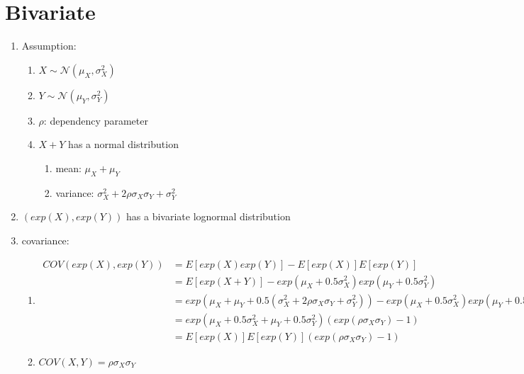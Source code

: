 \section{Bivariate \cite{ism-1}} \label{Lognormal Distribution: Bivariate}

\begin{enumerate}
    \item Assumption:
    \begin{enumerate}
        \item $X \sim \mathcal{N}(\mu_X, \sigma_X^2)$

        \item $Y \sim \mathcal{N}(\mu_Y, \sigma_Y^2)$

        \item $\rho$: dependency parameter

        \item $X + Y$ has a normal distribution
        \begin{enumerate}
            \item mean: $\mu_X + \mu_Y$

            \item variance: $\sigma_X^2 + 2\rho\sigma_X\sigma_Y + \sigma_Y^2$
        \end{enumerate}

    \end{enumerate}

    \item $(exp(X), exp(Y))$ has a bivariate lognormal distribution

    \item covariance:
    \begin{enumerate}
        \item 
        $\begin{aligned}
            COV(exp(X), exp(Y )) 
            &= E[exp(X) exp(Y )] - E[exp(X)]E[exp(Y )] \\
            &= E[exp(X + Y )] - exp(\mu_X + 0.5\sigma^2_X ) exp(\mu_Y + 0.5\sigma^2_Y ) \\
            &= exp(\mu_X + \mu_Y + 0.5(\sigma^2_X + 2\rho\sigma_X \sigma_Y + \sigma^2_Y ))
                 -exp(\mu_X + 0.5\sigma^2_X ) exp(\mu_Y + 0.5\sigma^2_Y ) \\
            &=exp(\mu_X + 0.5\sigma^2_X + \mu_Y + 0.5\sigma^2_Y )(exp(\rho\sigma_X \sigma_Y ) - 1) \\
            &= E[exp(X)]E[exp(Y )](exp(\rho\sigma_X \sigma_Y ) - 1)
        \end{aligned}$

        \item $COV(X, Y) = \rho\sigma_X\sigma_Y$
    \end{enumerate}

    
\end{enumerate}

